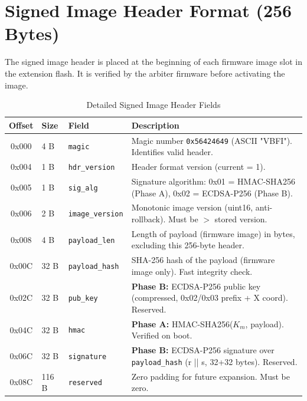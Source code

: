 \appendix
\section{Signed Image Header Format (256 Bytes)}
\label{app:signed_header}

The signed image header is placed at the beginning of each firmware image slot in the extension flash. It is verified by the arbiter firmware before activating the image.

\begin{table}[htbp]
\centering
\caption{Detailed Signed Image Header Fields}
\label{tab:signed_header_detail}
\begin{tabular}{@{}clll@{}}
\toprule
\textbf{Offset} & \textbf{Size} & \textbf{Field} & \textbf{Description} \\
\midrule
0x000 & 4 B & \texttt{magic} & Magic number \texttt{0x56424649} (ASCII "VBFI"). Identifies valid header. \\
0x004 & 1 B & \texttt{hdr\_version} & Header format version (current = 1). \\
0x005 & 1 B & \texttt{sig\_alg} & Signature algorithm: 0x01 = HMAC-SHA256 (Phase A), 0x02 = ECDSA-P256 (Phase B). \\
0x006 & 2 B & \texttt{image\_version} & Monotonic image version (uint16, anti-rollback). Must be $>$ stored version. \\
0x008 & 4 B & \texttt{payload\_len} & Length of payload (firmware image) in bytes, excluding this 256-byte header. \\
0x00C & 32 B & \texttt{payload\_hash} & SHA-256 hash of the payload (firmware image only). Fast integrity check. \\
0x02C & 32 B & \texttt{pub\_key} & \textbf{Phase B:} ECDSA-P256 public key (compressed, 0x02/0x03 prefix + X coord). Reserved. \\
0x04C & 32 B & \texttt{hmac} & \textbf{Phase A:} HMAC-SHA256($K_m$, payload). Verified on boot. \\
0x06C & 32 B & \texttt{signature} & \textbf{Phase B:} ECDSA-P256 signature over \texttt{payload\_hash} (r || s, 32+32 bytes). Reserved. \\
0x08C & 116 B & \texttt{reserved} & Zero padding for future expansion. Must be zero. \\
\bottomrule
\end{tabular}
\end{table}

